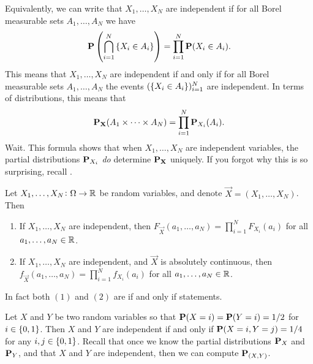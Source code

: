 \documentclass[11pt,a4paper]{article}
\begin{document}
\begin{remark}
  Equivalently,
  we can write that $X_1,\dots,X_N$ are independent if
  for all Borel measurable sets $A_1,\dots,A_N$ we have
  \[
    \Prob\del{\bigcap_{i=1}^{N} \set{X_i \in A_i}} =
    \prod_{i=1}^{N} \Prob(X_i \in A_i).
  \]
  This means that $X_1,\dots,X_N$ are independent if and only if
  for all Borel measurable sets $A_1,\dots,A_N$ the events
  $(\left\{X_i \in A_i\right\})_{i=1}^{N}$ are independent.
  In terms of distributions, this means that
  \[
    \mathbf{P}_{\boldsymbol{\mathbf{X}}}(A_1 \times \cdots \times A_N) =
    \prod_{i=1}^{N} \mathbf{P}_{X_i}(A_i).
  \]
  Wait.
  This formula shows that
  when $X_1,\dots,X_N$ are independent variables,
  the partial distributions $\mathbf{P}_{X_i}$ \textit{do} determine
  $\mathbf{P}_{\boldsymbol{\mathbf{X}}}$ uniquely.
  If you forgot why this is so surprising,
  recall .
\end{remark}

\begin{proposition}
  \label{prop:independent-rv-equivalencies}
  Let $X_1,\dots,X_N \colon \Omega \to \mathbb{R}$ be random variables,
  and denote $\vec X = (X_1,\dots,X_N)$.
  Then
  \begin{enumerate}
    \item[(1)] If $X_1,\dots,X_N$ are independent,
      then $F_{\vec X}(a_1,\dots,a_N) = \prod_{i=1}^{N} F_{X_i}(a_i)$
      for all $a_1,\dots,a_N \in \mathbb{R}$.
    \item[(2)] If $X_1,\dots,X_N$ are independent,
      and $\vec X$ is absolutely continuous,
      then $f_{\vec X}(a_1,\dots,a_N) = \prod_{i=1}^{N} f_{X_i}(a_i)$
      for all $a_1,\dots,a_N \in \mathbb{R}$.
  \end{enumerate}
\end{proposition}
\begin{remark}
  In fact both $(1)$ and $(2)$ are if and only if statements.
\end{remark}

\begin{example}
  Let $X$ and $Y$ be two random variables so that
  $\mathbf{P}(X = i) = \mathbf{P}(Y = i) = 1/2$ for $i \in \left\{0,1\right\}$.
  Then $X$ and $Y$ are independent if and only if
  $\mathbf{P}(X = i, Y = j) = 1/4$ for any $i,j \in \left\{0,1\right\}$.
  Recall that once we know the partial distributions $\mathbf{P}_X$ and $\mathbf{P}_Y$,
  and that $X$ and $Y$ are independent, then we can compute $\mathbf{P}_{(X,Y)}$.
\end{example}
\end{document}
